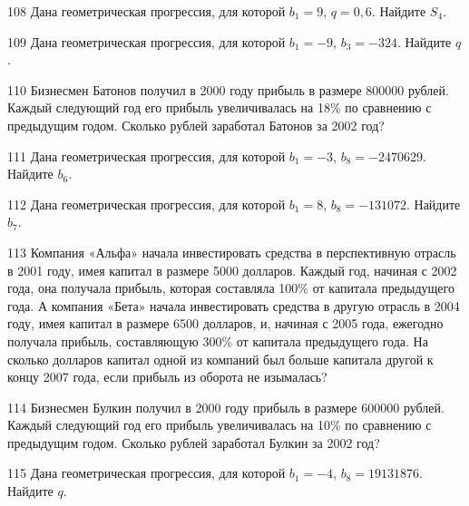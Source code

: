 \documentclass[4apaper]{article}
\begin{document}
\begin{taskBN}{108}
Дана геометрическая прогрессия, для которой $b_1 = 9$, $q=0,6$. Найдите $S_{4}$.
\end{taskBN}

\begin{taskBN}{109}
Дана геометрическая прогрессия, для которой $b_1 = -9$, $b_{3}=-324$. Найдите $q$.
\end{taskBN}

\begin{taskBN}{110}
Бизнесмен Батонов получил в 2000 году прибыль в размере 800000 рублей. Каждый следующий год его прибыль увеличивалась на 18\% по сравнению с предыдущим годом. Сколько рублей заработал Батонов за 2002 год?
\end{taskBN}

\begin{taskBN}{111}
Дана геометрическая прогрессия, для которой $b_1 = -3$, $b_{8}=-2470629$. Найдите $b_{6}$.
\end{taskBN}

\begin{taskBN}{112}
Дана геометрическая прогрессия, для которой $b_1 = 8$, $b_{8}=-131072$. Найдите $b_{7}$.
\end{taskBN}

\begin{taskBN}{113}
Компания «Альфа» начала инвестировать средства в перспективную отрасль в 2001 году, имея капитал в размере 5000 долларов. Каждый год, начиная с 2002 года, она получала прибыль, которая составляла 100\% от капитала предыдущего года. А компания «Бета» начала инвестировать средства в другую отрасль в 2004 году, имея капитал в размере 6500 долларов, и, начиная с 2005 года, ежегодно получала прибыль, составляющую 300\% от капитала предыдущего года. На сколько долларов капитал одной из компаний был больше капитала другой к концу 2007 года, если прибыль из оборота не изымалась?
\end{taskBN}

\begin{taskBN}{114}
Бизнесмен Булкин получил в 2000 году прибыль в размере 600000 рублей. Каждый следующий год его прибыль увеличивалась на 10\% по сравнению с предыдущим годом. Сколько рублей заработал Булкин за 2002 год?
\end{taskBN}

\begin{taskBN}{115}
Дана геометрическая прогрессия, для которой $b_1 = -4$, $b_{8}=19131876$. Найдите $q$.
\end{taskBN}
\end{document}
